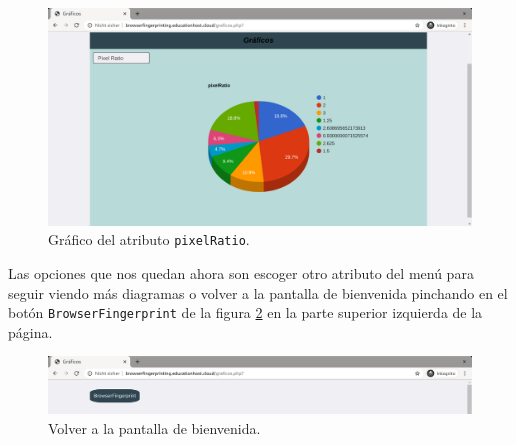 \begin{figure}[tbp]
	\centering
	\includegraphics[width=1\textwidth]{Images/pixelRatioChart.png}
	\caption{Gráfico del atributo \texttt{pixelRatio}.}
	\label{fig:pixelRatioChart}
\end{figure}

Las opciones que nos quedan ahora son escoger otro atributo del menú para seguir viendo más diagramas o volver a la pantalla de bienvenida pinchando en el botón \texttt{BrowserFingerprint} de la figura \ref{fig:wellcomeBoton} en la parte superior izquierda de la página.

\begin{figure}[tbp]
	\centering
	\includegraphics[width=1\textwidth]{Images/wellcomeBoton.png}
	\caption{Volver a la pantalla de bienvenida.}
	\label{fig:wellcomeBoton}
\end{figure}

